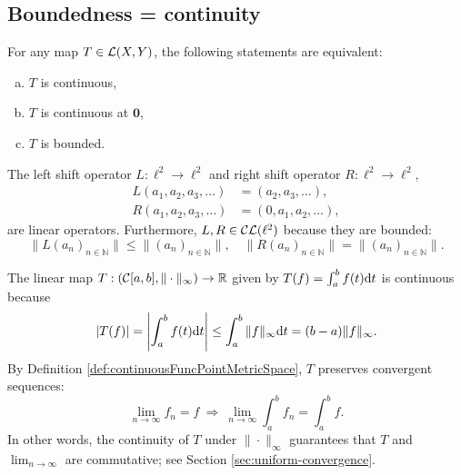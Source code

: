 \subsection{Boundedness = continuity}

\begin{thm}
  \label{thm:contLinearOpEquBoundedOp}
  For any map $T\in {\cal L}(X,Y)$, the following statements are equivalent:
  \begin{enumerate}[(a)]\itemsep0em
  \item $T$ is continuous,
  \item $T$ is continuous at $\mathbf{0}$,
  \item $T$ is bounded. 
  \end{enumerate}
\end{thm}

\begin{exm}
  \label{exm:leftAndRightShiftOnEll2}
  The left shift operator $L: \ell^2\rightarrow \ell^2$
  and right shift operator $R: \ell^2\rightarrow \ell^2$,
  \begin{align}
    \label{eq:leftShift}
    L(a_1, a_2, a_3, \ldots) &= (a_2, a_3, \ldots),
    \\
    \label{eq:rightShift}
    R(a_1, a_2, a_3, \ldots) &= (0, a_1, a_2,  \ldots),
  \end{align}
  are linear operators.
  Furthermore, $L, R\in {\cal CL}(\ell^2)$ because
  they are bounded:
  \begin{displaymath}
    \|L(a_n)_{n\in \mathbb{N}}\| \le \|(a_n)_{n\in \mathbb{N}}\|,
    \quad
    \|R(a_n)_{n\in \mathbb{N}}\| = \|(a_n)_{n\in \mathbb{N}}\|.
  \end{displaymath}
\end{exm}

\begin{exm}
  \label{exm:integralAsCLmap}
  The linear map $T: ({\cal C}[a,b],\|\cdot\|_{\infty})\rightarrow
  \mathbb{R}$
  given by $T(f) = \int_a^b f(t) \mathrm{d} t$ is continuous
  because
  \begin{displaymath}
    |T(f)| = \left|\int_a^b f(t) \mathrm{d} t\right|
    \le \int_a^b\|f\|_{\infty}\mathrm{d} t
    = (b-a) \|f\|_{\infty}.
  \end{displaymath}
  By Definition \ref{def:continuousFuncPointMetricSpace}, 
  $T$ preserves convergent sequences:
  \begin{displaymath}
    \lim_{n\rightarrow \infty} f_n = f
    \ \Rightarrow\
    \lim_{n\rightarrow \infty} \int_a^b f_n = \int_a^b f.
  \end{displaymath}
  In other words, the continuity of $T$
  under $\|\cdot\|_{\infty}$ guarantees
  that $T$ and $\lim_{n\rightarrow \infty}$ are commutative;
  see Section \ref{sec:uniform-convergence}.
\end{exm}


